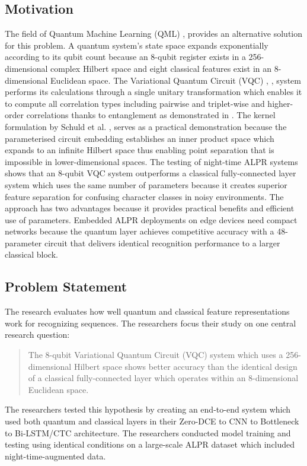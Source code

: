 \documentclass[preprint,12pt]{elsarticle}
\begin{document}
\subsection{Motivation}
The field of Quantum Machine Learning (QML) \cite{b9}, \cite{b10} provides an alternative solution for this problem. A quantum system's state space expands exponentially according to its qubit count because an 8-qubit register exists in a 256-dimensional complex Hilbert space and eight classical features exist in an 8-dimensional Euclidean space. The Variational Quantum Circuit (VQC) \cite{b10}, \cite{b22}, \cite{b24} system performs its calculations through a single unitary transformation which enables it to compute all correlation types including pairwise and triplet-wise and higher-order correlations thanks to entanglement as demonstrated in \cite{b9}. The kernel formulation by Schuld et al. \cite{b5}, \cite{b35} serves as a practical demonstration because the parameterised circuit embedding establishes an inner product space which expands to an infinite Hilbert space thus enabling point separation that is impossible in lower-dimensional spaces. The testing of night-time ALPR systems shows that an 8-qubit VQC system outperforms a classical fully-connected layer system which uses the same number of parameters because it creates superior feature separation for confusing character classes in noisy environments. The approach has two advantages because it provides practical benefits and efficient use of parameters. Embedded ALPR deployments on edge devices need compact networks because the quantum layer achieves competitive accuracy with a 48-parameter circuit that delivers identical recognition performance to a larger classical block.

\subsection{Problem Statement}
The research evaluates how well quantum and classical feature representations work for recognizing sequences. The researchers focus their study on one central research question:

\begin{quote}
The 8-qubit Variational Quantum Circuit (VQC) system which uses a 256-dimensional Hilbert space shows better accuracy than the identical design of a classical fully-connected layer which operates within an 8-dimensional Euclidean space.
\end{quote}

The researchers tested this hypothesis by creating an end-to-end system which used both quantum and classical layers in their Zero-DCE to CNN to Bottleneck to Bi-LSTM/CTC architecture. The researchers conducted model training and testing using identical conditions on a large-scale ALPR dataset which included night-time-augmented data.
\end{document}
